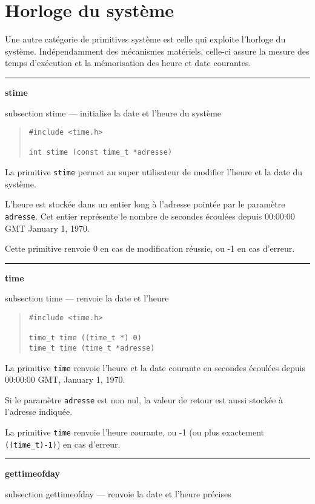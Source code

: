 \documentclass [twoside] {report}
\newcommand {\primitive} [1]
    {
	{\large \bf #1}
	\addcontentsline {toc} {subsection} {#1}
    }
\newcommand {\separation}
    {
	\vspace {7mm}
	\nopagebreak
	\hrule
    }
\begin{document}
\section {Horloge du système}


Une autre catégorie de primitives système est
celle qui exploite l'horloge du système.
Indépendamment des mécanismes matériels, celle-ci
assure la mesure des temps d'exé\-cu\-tion et la
mémorisation des heure et date courantes.



\separation
\primitive {stime} --- initialise la date et l'heure du système

\begin {quote}
\begin {verbatim}
#include <time.h>

int stime (const time_t *adresse)
\end{verbatim}
\end {quote}

La primitive {\tt stime} permet au super
utilisateur de modifier l'heure et la date du
système.

L'heure est stockée dans un entier long à
l'adresse pointée par le paramètre {\tt adresse}. Cet
entier représente le nombre de secondes écoulées
depuis 00:00:00 GMT January 1, 1970.

Cette primitive renvoie 0 en cas de modification
réussie, ou -1 en cas d'erreur.




\separation
\primitive {time} --- renvoie la date et l'heure

\begin {quote}
\begin {verbatim}
#include <time.h>

time_t time ((time_t *) 0)
time_t time (time_t *adresse)
\end{verbatim}
\end {quote}

La primitive {\tt time} renvoie l'heure et la date
courante en secondes écoulées depuis
00:00:00 GMT, January 1, 1970.

Si le paramètre {\tt adresse} est non nul, la valeur
de retour est aussi stockée à l'adresse
indiquée.

La primitive \texttt {time} renvoie l'heure courante, ou -1 (ou plus
exactement \verb|((time_t)-1)|) en cas d'erreur.


\separation
\primitive {gettimeofday} --- renvoie la date et l'heure précises
\end{document}
